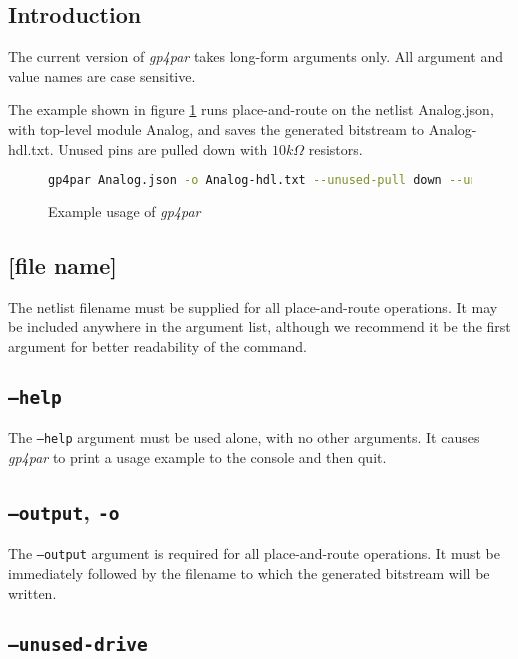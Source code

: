 \documentclass[11pt]{article}
\newcommand{\namestyle}[1]{\textit{#1}}
\begin{document}
\subsection{Introduction}

The current version of \namestyle{gp4par} takes long-form arguments only. All argument and value names are case sensitive.

The example shown in figure \ref{gp-cmd-example} runs place-and-route on the netlist Analog.json, with top-level module
Analog, and saves the generated bitstream to Analog-hdl.txt. Unused pins are pulled down with $10 k\Omega$ resistors.

\begin{figure}[h]
\begin{lstlisting}[language=sh]
gp4par Analog.json -o Analog-hdl.txt --unused-pull down --unused-drive 10k
\end{lstlisting}
\caption{Example usage of \namestyle{gp4par}}
\label{gp-cmd-example}
\end{figure}

\subsection{[file name]}

The netlist filename must be supplied for all place-and-route operations. It may be included anywhere in the argument
list, although we recommend it be the first argument for better readability of the command.

\subsection{\texttt{--help}}

The \texttt{--help} argument must be used alone, with no other arguments. It causes \namestyle{gp4par} to print a usage example to the
console and then quit.

\subsection{\texttt{--output}, \texttt{-o}}

The \texttt{--output} argument is required for all place-and-route operations. It must be immediately followed by the
filename to which the generated bitstream will be written.

\subsection{\texttt{--unused-drive}}
\end{document}
